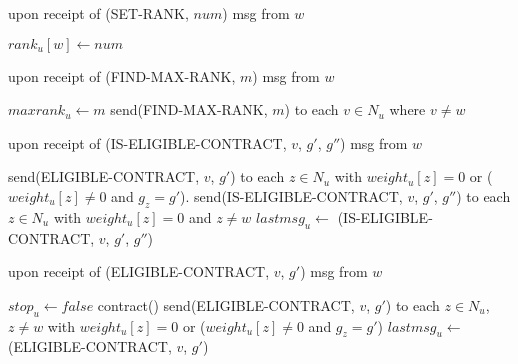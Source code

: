 \documentclass{acm_proc_article-sp}
\begin{document}
\begin{algorithm}                      \caption{upon receipt of (SET-RANK, $num$) msg from $w$}   \label{alg11}                           \begin{algorithmic}
\STATE $rank_{u}[w]\leftarrow num$
\end{algorithmic}
\end{algorithm}

\begin{algorithm}                      \caption{upon receipt of (FIND-MAX-RANK, $m$) msg from $w$}   \label{alg12}                           \begin{algorithmic}
\STATE{}
\STATE $maxrank_{u}\leftarrow m$
\STATE send(FIND-MAX-RANK, $m$) to each $v \in N_{u}$ where $v\neq w$
\ENDIF
\end{algorithmic}
\end{algorithm}

\begin{algorithm}                      \caption{upon receipt of (IS-ELIGIBLE-CONTRACT, $v$, $g'$, $g''$) msg from $w$}   \label{alg13}                           \begin{algorithmic}
\STATE{}
\STATE send(ELIGIBLE-CONTRACT, $v$, $g'$) to each $z\in N_{u}$ with $weight_{u}[z]=0$ or ($weight_{u}[z]\neq 0$ and $g_{z}=g'$). 
\ELSE
\STATE send(IS-ELIGIBLE-CONTRACT, $v$, $g'$, $g''$) to each $z\in N_{u}$ with $weight_{u}[z]=0$ and $z\neq w$
\ENDIF
\STATE $lastmsg_{u}\leftarrow$ (IS-ELIGIBLE-CONTRACT, $v$, $g'$, $g''$)
\ENDIF
\end{algorithmic}
\end{algorithm}

\begin{algorithm}                      \caption{upon receipt of (ELIGIBLE-CONTRACT, $v$, $g'$) msg from $w$}   \label{alg14}                           \begin{algorithmic}
\STATE $stop_{u}\leftarrow false$
\STATE contract()
\ELSE
\STATE send(ELIGIBLE-CONTRACT, $v$, $g'$) to each $z\in N_{u}$, $z\neq w$ with $weight_{u}[z]=0$ or ($weight_{u}[z]\neq 0$ and $g_{z}=g'$)
\ENDIF
\STATE $lastmsg_{u}\leftarrow$ (ELIGIBLE-CONTRACT, $v$, $g'$)
\ENDIF
\end{algorithmic}
\end{algorithm}
\end{document}
